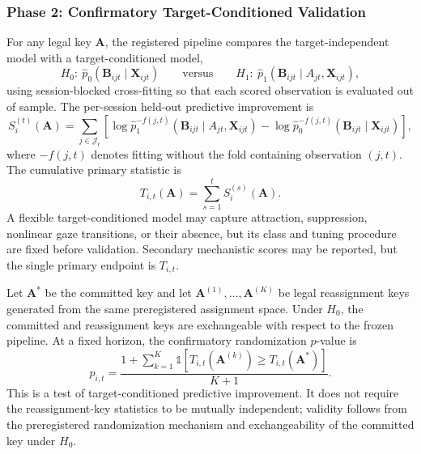 \documentclass[11pt,letterpaper]{article}
\begin{document}
\subsubsection{Phase 2: Confirmatory Target-Conditioned Validation}
\label{sec:phase2}
For any legal key $\mathbf{A}$, the registered pipeline compares the target-independent model with a target-conditioned model,
\begin{equation}
H_0:\ \hat p_0(\mathbf{B}_{ijt}\mid\mathbf{X}_{ijt})
\qquad\text{versus}\qquad
H_1:\ \hat p_1(\mathbf{B}_{ijt}\mid A_{jt},\mathbf{X}_{ijt}),
\label{eq:targetmodels}
\end{equation}
using session-blocked cross-fitting so that each scored observation is evaluated out of sample. The per-session held-out predictive improvement is
\begin{equation}
S_i^{(t)}(\mathbf{A}) = \sum_{j\in\mathcal{J}_t}\left[
\log \hat p_1^{-f(j,t)}\!\left(\mathbf{B}_{ijt}\mid A_{jt},\mathbf{X}_{ijt}\right)
-\log \hat p_0^{-f(j,t)}\!\left(\mathbf{B}_{ijt}\mid\mathbf{X}_{ijt}\right)
\right],
\label{eq:complik}
\end{equation}
where $-f(j,t)$ denotes fitting without the fold containing observation $(j,t)$. The cumulative primary statistic is
\begin{equation}
T_{i,t}(\mathbf{A}) = \sum_{s=1}^{t} S_i^{(s)}(\mathbf{A}).
\label{eq:cumllr}
\end{equation}
A flexible target-conditioned model may capture attraction, suppression, nonlinear gaze transitions, or their absence, but its class and tuning procedure are fixed before validation. Secondary mechanistic scores may be reported, but the single primary endpoint is $T_{i,t}$.

Let $\mathbf{A}^{*}$ be the committed key and let $\mathbf{A}^{(1)},\ldots,\mathbf{A}^{(K)}$ be legal reassignment keys generated from the same preregistered assignment space. Under $H_0$, the committed and reassignment keys are exchangeable with respect to the frozen pipeline. At a fixed horizon, the confirmatory randomization $p$-value is
\begin{equation}
p_{i,t}=\frac{1+\sum_{k=1}^{K}\mathbb{1}\!\left[T_{i,t}(\mathbf{A}^{(k)})\geq T_{i,t}(\mathbf{A}^{*})\right]}{K+1}.
\label{eq:keyrank}
\end{equation}
This is a test of target-conditioned predictive improvement. It does not require the reassignment-key statistics to be mutually independent; validity follows from the preregistered randomization mechanism and exchangeability of the committed key under $H_0$.
\end{document}
